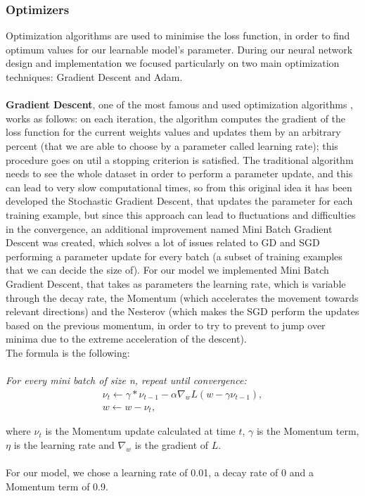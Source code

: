 \documentclass[12pt]{article}
\begin{document}
\subsubsection{Optimizers}
Optimization algorithms are used to minimise the loss function, in order to find optimum values for our learnable model’s parameter. During our neural network design and implementation we focused particularly on two main optimization techniques: Gradient Descent and Adam. \\ \\
\textbf{Gradient Descent}, one of the most famous and used optimization algorithms  \cite{hertz1991introduction}, works as follows: on each iteration, the algorithm computes the gradient of the loss function for the current weights values and updates them by an arbitrary percent (that we are able to choose by a parameter called learning rate); this procedure goes on util a stopping criterion is satisfied. 
The traditional algorithm needs to see the whole dataset in order to perform a parameter update, and this can lead to very slow computational times, so from this original idea it has been developed the Stochastic Gradient Descent, that updates the parameter for each training example, but since this approach can lead to fluctuations and difficulties in the convergence, an additional improvement named Mini Batch Gradient Descent was created, which solves a lot of issues related to GD and SGD performing a parameter update for every batch (a subset of training examples that we can decide the size of). 
For our model we implemented Mini Batch Gradient Descent, that takes as parameters the learning rate, which is variable through the decay rate, the Momentum (which accelerates the movement towards relevant directions) and the Nesterov (which makes the SGD perform the updates based on the previous momentum, in order to try to prevent to jump over minima due to the extreme acceleration of the descent).  \\
The formula is the following: \\ \\

\textit{For every mini batch of size n, repeat until convergence:} 
\begin{align*}
\nu_{t}  \gets \gamma  *  \nu_{t-1} - \alpha \nabla_{w} L(w - \gamma\nu_{t-1}), \\
w \gets  w - \nu_{t},
\end{align*}


where $\nu_{t}$ is the Momentum update calculated at time $t$, $\gamma$ is the Momentum term, $\eta$ is the learning rate and $\nabla_{w}$ is the gradient of $L$.   \\ \\
For our model, we chose a learning rate of 0.01, a decay rate of 0 and a Momentum term of 0.9. \\
\end{document}
